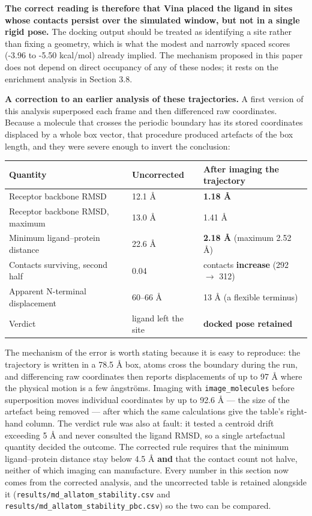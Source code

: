 \documentclass[utf8]{FrontiersinVancouver}
\begin{document}
\textbf{The correct reading is therefore that Vina placed the ligand in sites whose contacts persist over the simulated window, but not in a single rigid pose.} The docking output should be treated as identifying a site rather than fixing a geometry, which is what the modest and narrowly spaced scores (-3.96 to -5.50 kcal/mol) already implied. The mechanism proposed in this paper does not depend on direct occupancy of any of these nodes; it rests on the enrichment analysis in Section 3.8.

\textbf{A correction to an earlier analysis of these trajectories.} A first version of this analysis superposed each frame and then differenced raw coordinates. Because a molecule that crosses the periodic boundary has its stored coordinates displaced by a whole box vector, that procedure produced artefacts of the box length, and they were severe enough to invert the conclusion:

\begin{table}[htbp]
\centering
\begin{tabular}{lll}
\hline
Quantity & Uncorrected & After imaging the trajectory \\
\hline
Receptor backbone RMSD & 12.1 \AA{} & \textbf{1.18 \AA{}} \\
Receptor backbone RMSD, maximum & 13.0 \AA{} & 1.41 \AA{} \\
Minimum ligand--protein distance & 22.6 \AA{} & \textbf{2.18 \AA{}} (maximum 2.52 \AA{}) \\
Contacts surviving, second half & 0.04 & contacts \textbf{increase} (292 $\rightarrow$ 312) \\
Apparent N-terminal displacement & 60--66 \AA{} & 13 \AA{} (a flexible terminus) \\
Verdict & ligand left the site & \textbf{docked pose retained} \\
\hline
\end{tabular}
\end{table}

The mechanism of the error is worth stating because it is easy to reproduce: the trajectory is written in a 78.5 \AA{} box, atoms cross the boundary during the run, and differencing raw coordinates then reports displacements of up to 97 \AA{} where the physical motion is a few \aa{}ngströms. Imaging with \texttt{image\_molecules} before superposition moves individual coordinates by up to 92.6 \AA{} --- the size of the artefact being removed --- after which the same calculations give the table's right-hand column. The verdict rule was also at fault: it tested a centroid drift exceeding 5 \AA{} and never consulted the ligand RMSD, so a single artefactual quantity decided the outcome. The corrected rule requires that the minimum ligand--protein distance stay below 4.5 \AA{} \textbf{and} that the contact count not halve, neither of which imaging can manufacture. Every number in this section now comes from the corrected analysis, and the uncorrected table is retained alongside it (\texttt{results/md\_allatom\_stability.csv} and \texttt{results/md\_allatom\_stability\_pbc.csv}) so the two can be compared.
\end{document}
